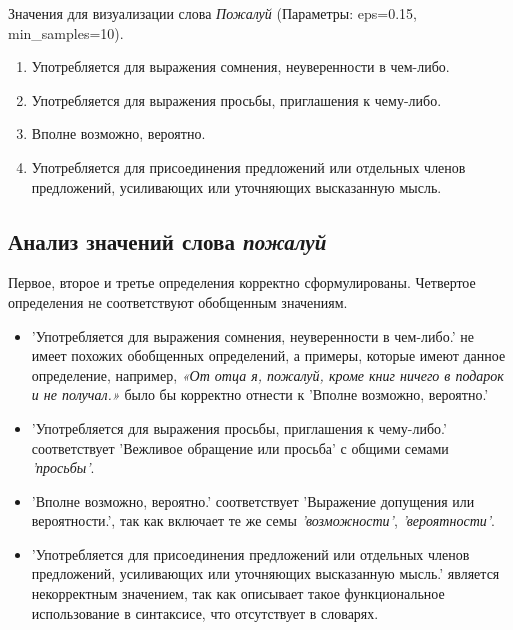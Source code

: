 Значения для визуализации слова \textit{Пожалуй} (Параметры: eps=0.15, min\_samples=10).

\begin{enumerate}
    \item Употребляется для выражения сомнения, неуверенности в чем-либо.
    \item Употребляется для выражения просьбы, приглашения к чему-либо.
    \item Вполне возможно, вероятно.
    \item Употребляется для присоединения предложений или отдельных членов предложений,
усиливающих или уточняющих высказанную мысль.
\end{enumerate}

\subsection*{Анализ значений слова \textit{пожалуй}}

Первое, второе и третье определения корректно сформулированы.
Четвертое определения не соответствуют обобщенным значениям.

\begin{itemize}
    \item ’Употребляется для выражения сомнения, неуверенности в чем-либо.’
не имеет похожих обобщенных определений, а примеры, которые имеют данное определение,
например, \textit{«От отца я, пожалуй, кроме книг ничего в подарок и не получал.»}
было бы корректно отнести к ’Вполне возможно, вероятно.’

    \item ’Употребляется для выражения просьбы, приглашения к чему-либо.’ соответствует
’Вежливое обращение или просьба’ с общими семами \textit{’просьбы’}.

    \item ’Вполне возможно, вероятно.’ соответствует
’Выражение допущения или вероятности.’, так как включает те же семы \textit{’возможности’}, \textit{’вероятности’}.
\end{itemize}

\begin{itemize}
    \item ’Употребляется для присоединения предложений или отдельных членов предложений,
усиливающих или уточняющих высказанную мысль.’ является некорректным значением,
так как описывает такое функциональное использование в синтаксисе, что отсутствует в словарях.
\end{itemize}

